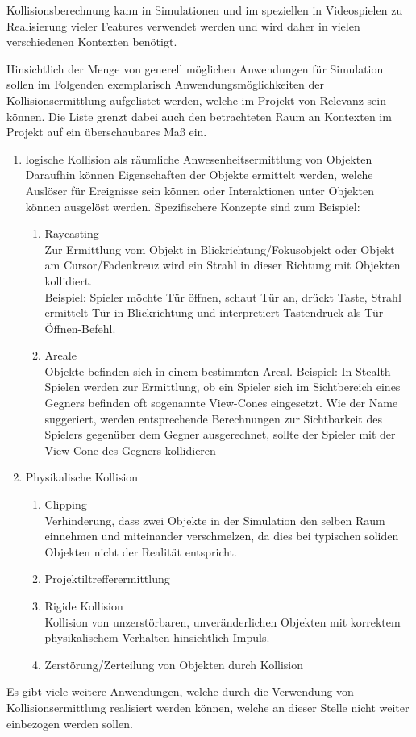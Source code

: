 \label{sec:usages}
Kollisionsberechnung kann in Simulationen und im speziellen in Videospielen zu Realisierung vieler Features verwendet werden und wird daher in vielen verschiedenen Kontexten benötigt. 

Hinsichtlich der Menge von generell möglichen Anwendungen für Simulation sollen im Folgenden exemplarisch Anwendungsmöglichkeiten der Kollisionsermittlung aufgelistet werden, welche im Projekt von Relevanz sein können. Die Liste grenzt dabei auch den betrachteten Raum an Kontexten im Projekt auf ein überschaubares Maß ein. 

\begin{enumerate}
	\item logische Kollision als räumliche Anwesenheitsermittlung von Objekten\\
	Daraufhin können Eigenschaften der Objekte ermittelt werden, welche Auslöser für Ereignisse sein können oder Interaktionen unter Objekten können ausgelöst werden. Spezifischere Konzepte sind zum Beispiel: 
		\begin{enumerate}
			\item Raycasting\\
	Zur Ermittlung vom Objekt in Blickrichtung/Fokusobjekt oder Objekt am Cursor/Fadenkreuz wird ein Strahl in dieser Richtung mit Objekten kollidiert.\\
	Beispiel: Spieler möchte Tür öffnen, schaut Tür an, drückt Taste, Strahl ermittelt Tür in Blickrichtung und interpretiert Tastendruck als Tür-Öffnen-Befehl.
			\item Areale\\
	Objekte befinden sich in einem bestimmten Areal.
	Beispiel: In Stealth-Spielen werden zur Ermittlung, ob ein  Spieler sich im Sichtbereich eines Gegners befinden oft sogenannte View-Cones eingesetzt. Wie der Name suggeriert, werden entsprechende Berechnungen zur Sichtbarkeit des Spielers gegenüber dem Gegner ausgerechnet, sollte der Spieler mit der View-Cone des Gegners kollidieren
		\end{enumerate}

	\item Physikalische Kollision
		\begin{enumerate}
			\item Clipping\\
	Verhinderung, dass zwei Objekte in der Simulation den selben Raum einnehmen und miteinander verschmelzen, da dies bei typischen soliden Objekten nicht der Realität entspricht.
			\item Projektiltrefferermittlung
			\item Rigide Kollision\\
		Kollision von unzerstörbaren, unveränderlichen Objekten mit korrektem physikalischem Verhalten hinsichtlich Impuls.
			\item Zerstörung/Zerteilung von Objekten durch Kollision
		\end{enumerate}
\end{enumerate}

Es gibt viele weitere Anwendungen, welche durch die Verwendung von Kollisionsermittlung realisiert werden können, welche an dieser Stelle nicht weiter einbezogen werden sollen.

